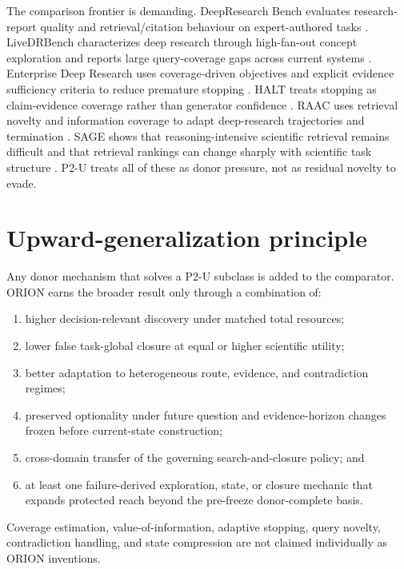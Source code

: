 \documentclass[11pt]{article}
\begin{document}
The comparison frontier is demanding. DeepResearch Bench evaluates research-report quality and retrieval/citation behaviour on expert-authored tasks \cite{deepresearchbench2026}. LiveDRBench characterizes deep research through high-fan-out concept exploration and reports large query-coverage gaps across current systems \cite{livedrbench2026}. Enterprise Deep Research uses coverage-driven objectives and explicit evidence sufficiency criteria to reduce premature stopping \cite{dontstopearly2026}. HALT treats stopping as claim-evidence coverage rather than generator confidence \cite{halt2026}. RAAC uses retrieval novelty and information coverage to adapt deep-research trajectories and termination \cite{raac2026}. SAGE shows that reasoning-intensive scientific retrieval remains difficult and that retrieval rankings can change sharply with scientific task structure \cite{sage2026}. P2-U treats all of these as donor pressure, not as residual novelty to evade.

\section{Upward-generalization principle}
Any donor mechanism that solves a P2-U subclass is added to the comparator. ORION earns the broader result only through a combination of:
\begin{enumerate}
    \item higher decision-relevant discovery under matched total resources;
    \item lower false task-global closure at equal or higher scientific utility;
    \item better adaptation to heterogeneous route, evidence, and contradiction regimes;
    \item preserved optionality under future question and evidence-horizon changes frozen before current-state construction;
    \item cross-domain transfer of the governing search-and-closure policy; and
    \item at least one failure-derived exploration, state, or closure mechanic that expands protected reach beyond the pre-freeze donor-complete basis.
\end{enumerate}
Coverage estimation, value-of-information, adaptive stopping, query novelty, contradiction handling, and state compression are not claimed individually as ORION inventions.
\end{document}
